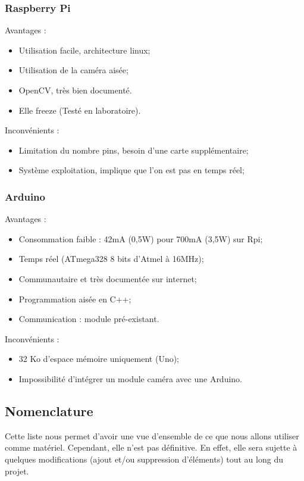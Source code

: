 \subsubsection{Raspberry Pi}
\noindent Avantages :
\begin{itemize}
	\item Utilisation facile, architecture linux;
	\item Utilisation de la caméra aisée;
	\item OpenCV, très bien documenté.
	\item Elle freeze (Testé en laboratoire).
\end{itemize}

\noindent Inconvénients :
\begin{itemize}
	\item Limitation du nombre pins, besoin d'une carte supplémentaire;
	\item Système exploitation, implique que l'on est pas en temps réel; 
	
\end{itemize}

\subsubsection{Arduino}
\noindent Avantages :
\begin{itemize}
	\item Consommation faible : 42mA (0,5W) pour 700mA (3,5W) sur Rpi;
	\item Temps réel (ATmega328 8 bits d'Atmel à 16MHz);
	\item Communautaire et très documentée sur internet;
	\item Programmation aisée en C++;
	\item Communication : module pré-existant.
\end{itemize}

\noindent Inconvénients :
\begin{itemize}
\item 32 Ko d'espace mémoire uniquement (Uno);
\item Impossibilité d'intégrer un module caméra avec une Arduino.
\end{itemize}

\subsection{Nomenclature}
Cette liste nous permet d'avoir une vue d'ensemble de ce que nous allons utiliser comme matériel. Cependant, elle n'est pas définitive. En effet, elle sera sujette à quelques modifications (ajout et/ou suppression d'éléments) tout au long du projet. 

